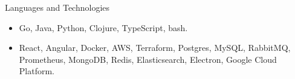 \documentclass[]{cv}
\begin{document}
	\begin{cvsection}{Languages and Technologies}
		\begin{cvsubsection}{}{}{}	
			\begin{itemize}
				\item Go, Java, Python, Clojure, TypeScript, bash. 
				\item React, Angular, Docker, AWS, Terraform, Postgres, MySQL, RabbitMQ, Prometheus, MongoDB, Redis, Elasticsearch, Electron, Google Cloud Platform.
			\end{itemize}
		\end{cvsubsection}
	\end{cvsection}
	
\end{document}
